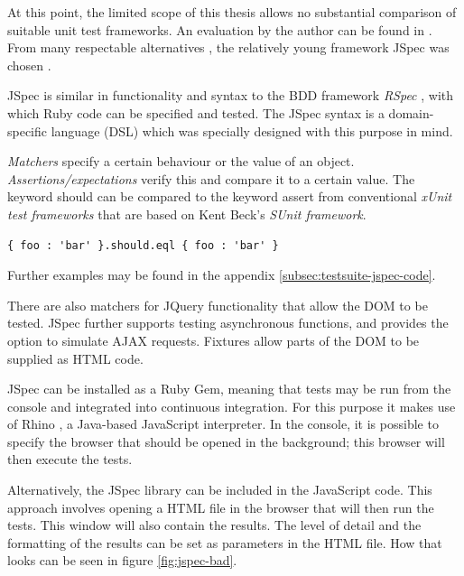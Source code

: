 At this point, the limited scope of this thesis allows no substantial comparison of suitable unit test frameworks. An evaluation by the author can be found in \cite{jspec:evaluation}. From many respectable alternatives \cite{jspec:unitlist}, the relatively young framework JSpec was chosen \cite{jspec:website}.

JSpec is similar in functionality and syntax to the BDD framework \textit{RSpec} \cite{rspec:website}, with which Ruby code can be specified and tested. The JSpec syntax is a domain-specific language (DSL) which was specially designed with this purpose in mind.

\textit{Matchers} specify a certain behaviour or the value of an object. \textit{Assertions/expectations} verify this and compare it to a certain value. The keyword {\selectfont should} can be compared to the keyword {\selectfont assert} from conventional \textit{xUnit test frameworks} that are based on Kent Beck's \textit{SUnit framework}.

\medskip
\begin{lstlisting}[caption=JSpec example: the matcher {\fontfamily{pcr}\selectfont eql}]
{ foo : 'bar' }.should.eql { foo : 'bar' }
\end{lstlisting}

Further examples may be found in the appendix \ref{subsec:testsuite-jspec-code}.

There are also matchers for JQuery functionality that allow the DOM to be tested. JSpec further supports testing asynchronous functions, and provides the option to simulate AJAX requests. Fixtures allow parts of the DOM to be supplied as HTML code.

JSpec can be installed as a Ruby Gem, meaning that tests may be run from the console and integrated into continuous integration. For this purpose it makes use of Rhino \cite{rhino:website}, a Java-based JavaScript interpreter. In the console, it is possible to specify the browser that should be opened in the background; this browser will then execute the tests.

Alternatively, the JSpec library can be included in the JavaScript code. This approach involves opening a HTML file in the browser that will then run the tests. This window will also contain the results. The level of detail and the formatting of the results can be set as parameters in the HTML file. How that looks can be seen in figure \ref{fig:jspec-bad}.

